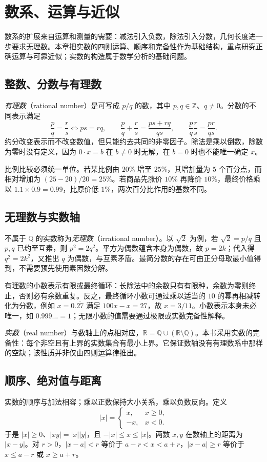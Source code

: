 \setcounter{chapter}{1} %
\chapter{数系、运算与近似}
\label{chap:em-numbers}
数系的扩展来自运算和测量的需要：减法引入负数，除法引入分数，几何长度进一步要求无理数。本章把实数的四则运算、顺序和完备性作为基础结构，重点研究正确运算与可靠近似；实数的构造属于数学分析的基础问题。

\section{整数、分数与有理数}
\emph{有理数}（rational number）是可写成 $p/q$ 的数，其中 $p,q\in\mathbb Z$、$q\ne0$。分数的不同表示满足
\[
 \frac pq=\frac rs\Longleftrightarrow ps=rq,\qquad
 \frac pq+\frac rs=\frac{ps+rq}{qs},\qquad
 \frac pq\frac rs=\frac{pr}{qs}.
\]
约分改变表示而不改变数值，但只能约去共同的非零因子。除法是乘以倒数，除数为零时没有定义，因为 $0\cdot x=b$ 在 $b\ne0$ 时无解，在 $b=0$ 时也不能唯一确定 $x$。

比例比较必须统一单位。若某比例由 $20\%$ 增至 $25\%$，其增加量为 $5$ 个百分点，而相对增加为 $(25-20)/20=25\%$。若商品先涨价 $10\%$ 再降价 $10\%$，最终价格乘以 $1.1\times0.9=0.99$，比原价低 $1\%$，两次百分比作用的基数不同。

\section{无理数与实数轴}
不属于 $\mathbb Q$ 的实数称为\emph{无理数}（irrational number）。以 $\sqrt2$ 为例，若 $\sqrt2=p/q$ 且 $p,q$ 已约至互素，则 $p^2=2q^2$。平方为偶数蕴含本身为偶数，故 $p=2k$；代入得 $q^2=2k^2$，又推出 $q$ 为偶数，与互素矛盾。最简分数的存在可由正分母取最小值得到，不需要预先使用素因数分解。

有理数的小数表示有限或最终循环：长除法中的余数只有有限种，余数为零则终止，否则必有余数重复。反之，最终循环小数可通过乘以适当的 $10$ 的幂再相减转化为分数，例如 $x=0.\overline{27}$ 满足 $100x-x=27$，故 $x=3/11$。小数表示本身未必唯一，如 $0.999\ldots=1$；无限小数的值需要通过极限或实数完备性解释。

\emph{实数}（real number）与数轴上的点相对应，$\mathbb R=\mathbb Q\cup(\mathbb R\setminus\mathbb Q)$。本书采用实数的完备性：每个非空且有上界的实数集合有最小上界。它保证数轴没有有理数系中那样的空缺；该性质并非仅由四则运算律推出。

\section{顺序、绝对值与距离}
实数的顺序与加法相容；乘以正数保持大小关系，乘以负数反向。定义
\[
 |x|=\begin{cases}x,&x\ge0,\\-x,&x<0.\end{cases}
\]
于是 $|x|\ge0$、$|xy|=|x||y|$，且 $-|x|\le x\le|x|$。两数 $x,y$ 在数轴上的距离为 $|x-y|$。对 $r>0$，$|x-a|<r$ 等价于 $a-r<x<a+r$，$|x-a|\ge r$ 等价于 $x\le a-r$ 或 $x\ge a+r$。

